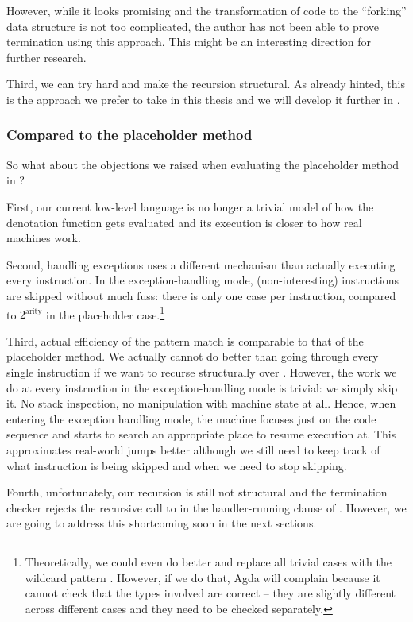 However, while it looks promising and the transformation of code to the
``forking'' data structure is not too complicated, the author has not been able
to prove termination using this approach. This might be an interesting direction
for further research.

Third, we can try hard and make the recursion structural. As already hinted,
this is the approach we prefer to take in this thesis and we will develop it
further in .

\subsubsection{Compared to the placeholder method}

So what about the objections we raised when evaluating the placeholder method
in ?

First, our current low-level language is no longer a trivial model of how the
denotation function  gets evaluated and its execution is closer
to how real machines work.

Second, handling exceptions uses a different mechanism than actually executing
every instruction. In the exception-handling mode, (non-interesting)
instructions are skipped without much fuss: there is only one case per
instruction, compared to $2^\mathrm{arity}$ in the placeholder
case.\footnote{Theoretically, we could even do better and replace all trivial
cases with the wildcard pattern \ident{\_}. However, if we do that, Agda will
complain because it cannot check that the types involved are correct
-- they are slightly different across different cases and they need to be
checked separately.}

Third, actual efficiency of the pattern match is comparable to that of the
placeholder method. We actually cannot do better than going through every
single instruction if we want to recurse structurally over .
However, the work we do at every instruction in the exception-handling mode is
trivial: we simply skip it. No stack inspection, no manipulation with machine
state at all.  Hence, when entering the exception handling mode, the machine
focuses just on the code sequence and starts to search an appropriate place to
resume execution at. This approximates real-world jumps better although we still
need to keep track of what instruction is being skipped and when we need to
stop skipping.

Fourth, unfortunately, our recursion is still not structural and the
termination checker rejects the recursive call to  in the
handler-running clause of . However, we are going to address
this shortcoming soon in the next sections.

